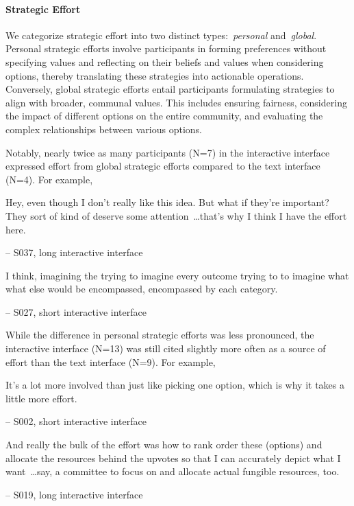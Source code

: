 \paragraph{Strategic Effort}
We categorize strategic effort into two distinct types:~\textit{personal} and~\textit{global}. Personal strategic efforts involve participants in forming preferences without specifying values and reflecting on their beliefs and values when considering options, thereby translating these strategies into actionable operations. Conversely, global strategic efforts entail participants formulating strategies to align with broader, communal values. This includes ensuring fairness, considering the impact of different options on the entire community, and evaluating the complex relationships between various options.

Notably, nearly twice as many participants (N=7) in the interactive interface expressed effort from global strategic efforts compared to the text interface (N=4). For example,

\begin{displayquote}
Hey, even though I don't really like this idea. But what if they're important? They sort of kind of deserve some attention~\ldots that's why I think I have the effort here.

\noindent \hfill -- S037, long interactive interface
\end{displayquote}

\begin{displayquote}
I think, imagining the trying to imagine every outcome trying to to imagine what what else would be encompassed, encompassed by each category.

\noindent \hfill -- S027, short interactive interface
\end{displayquote}

While the difference in personal strategic efforts was less pronounced, the interactive interface (N=13) was still cited slightly more often as a source of effort than the text interface (N=9). For example,

\begin{displayquote}
It's a lot more involved than just like picking one option, which is why it takes a little more effort.

\noindent \hfill -- S002, short interactive interface
\end{displayquote}
    
\begin{displayquote}
And really the bulk of the effort was how to rank order these (options) and allocate the resources behind the upvotes so that I can accurately depict what I want~\ldots say, a committee to focus on and allocate actual fungible resources, too. 

\noindent \hfill -- S019, long interactive interface
\end{displayquote}

